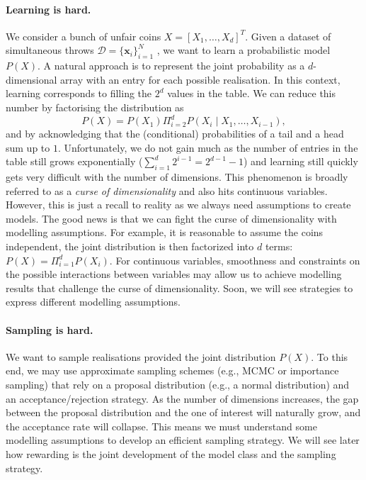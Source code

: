 \paragraph{Learning is hard.} We consider a bunch of unfair coins $X = \left[X_1, \dots, X_d \right]^T$. Given a dataset of simultaneous throws $\mathcal{D} = \{\bm{x}_i\}_{i=1}^N$ , we want to learn a probabilistic model $P(X)$. A natural approach is to represent the joint probability as a $d$-dimensional array with an entry for each possible realisation. In this context, learning corresponds to filling the $2^d$ values in the table. We can reduce this number by factorising the distribution as
$$P(X) = P(X_1)\Pi_{i=2}^d P(X_i\mid X_1, \dots, X_{i-1}),$$ and by acknowledging that the (conditional) probabilities of a tail and a head sum up to $1$. Unfortunately, we do not gain much as the number of entries in the table still grows exponentially ($\sum_{i=1}^d 2^{i-1} = 2^{d-1} - 1$) and learning still quickly gets very difficult with the number of dimensions. This phenomenon is broadly referred to as a \textit{curse of dimensionality} and also hits continuous variables. However, this is just a recall to reality as we always need assumptions to create models. The good news is that we can fight the curse of dimensionality with modelling assumptions. For example, it is reasonable to assume the coins independent, the joint distribution is then factorized into $d$ terms: $ P(X) = \Pi_{i=1}^d P(X_i)$. For continuous variables, smoothness and constraints on the possible interactions between variables may allow us to achieve modelling results that challenge the curse of dimensionality. Soon, we will see strategies to express different modelling assumptions.

\paragraph{Sampling is hard.} We want to sample realisations provided the joint distribution $P(X)$. To this end, we may use approximate sampling schemes (e.g., MCMC or importance sampling) that rely on a proposal distribution (e.g., a normal distribution) and an acceptance/rejection strategy. As the number of dimensions increases, the gap between the proposal distribution and the one of interest will naturally grow, and the acceptance rate will collapse. This means we must understand some modelling assumptions to develop an efficient sampling strategy. We will see later how rewarding is the joint development of the model class and the sampling strategy.

